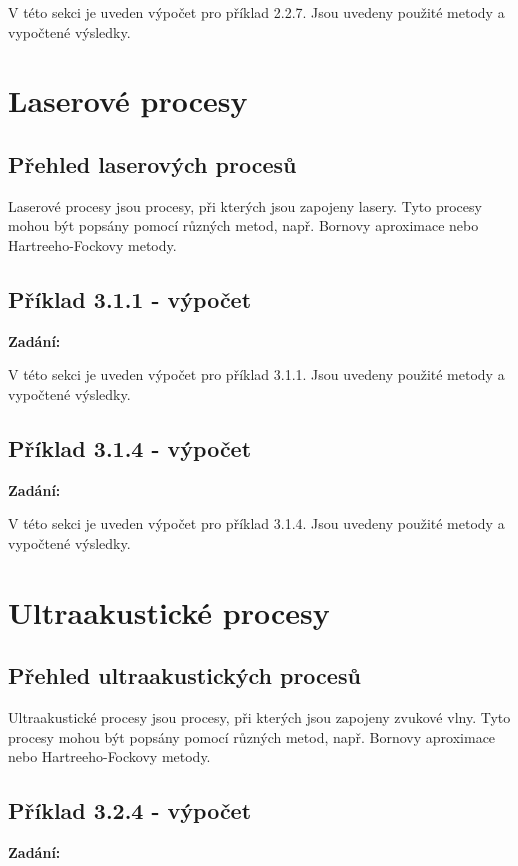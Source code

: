 \documentclass{article}
\newenvironment{zadani}
{\begin{center}\textbf{Zadání:}\itshape}{\end{center}}
\begin{document}
V této sekci je uveden výpočet pro příklad 2.2.7. Jsou uvedeny použité metody a vypočtené výsledky.

\section{Laserové procesy}

\subsection{Přehled laserových procesů}

Laserové procesy jsou procesy, při kterých jsou zapojeny lasery. Tyto procesy mohou být popsány pomocí různých metod, např. Bornovy aproximace nebo Hartreeho-Fockovy metody.

\subsection{Příklad 3.1.1 - výpočet}
\begin{zadani}

\end{zadani}


V této sekci je uveden výpočet pro příklad 3.1.1. Jsou uvedeny použité metody a vypočtené výsledky.

\subsection{Příklad 3.1.4 - výpočet}
\begin{zadani}

\end{zadani}


V této sekci je uveden výpočet pro příklad 3.1.4. Jsou uvedeny použité metody a vypočtené výsledky.

\section{Ultraakustické procesy}

\subsection{Přehled ultraakustických procesů}

Ultraakustické procesy jsou procesy, při kterých jsou zapojeny zvukové vlny. Tyto procesy mohou být popsány pomocí různých metod, např. Bornovy aproximace nebo Hartreeho-Fockovy metody.

\subsection{Příklad 3.2.4 - výpočet}
\begin{zadani}

\end{zadani}
\end{document}
